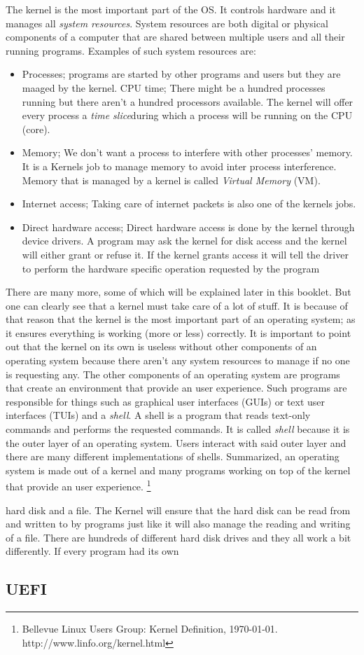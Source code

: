 The kernel is the most important part of the OS. It controls hardware and it
manages all \textit{system resources}. System resources are both digital or physical
components of a computer that are shared between multiple users and all their
running programs. Examples of such system resources are:
\begin{itemize}
\item Processes; programs are started by other programs and users but they are maaged by the kernel.
	CPU time; There might be a hundred processes running but there aren't a hundred processors available. The kernel will offer every process a \textit{time slice}during which a process will be running on the CPU (core).
\item Memory; We don't want a process to interfere with other processes' memory. It is a Kernels job to manage memory to avoid inter process interference. Memory that is managed by a kernel is called \textit{Virtual Memory} (VM).
\item Internet access; Taking care of internet packets is also one of the kernels jobs.
\item Direct hardware access; Direct hardware access is done by the kernel through device drivers. A program may ask the kernel for disk access and the kernel will either grant or refuse it. If the kernel grants access it will tell the driver to perform the hardware specific operation requested by the program
\end{itemize}
There are many more, some of which will be explained later in this booklet.
But one can clearly see that a kernel must take care of a lot of stuff. It
is because of that reason that the kernel is the most important part of an
operating system; as it ensures everything is working (more or less)
correctly. It is important to point out that the kernel on its own is useless
without other components of an operating system because there aren't any
system resources to manage if no one is requesting any.
The other components of an
operating system are programs that create an environment that provide an user
experience. Such programs are responsible for things such as graphical user
interfaces (GUIs) or text user interfaces (TUIs) and a \textit{shell}. A shell is a
program that reads text-only commands and performs the requested commands. It
is called \textit{shell} because it is the outer layer of an operating system. Users
interact with said outer layer and there are many different implementations
of shells. Summarized, an operating system is made out of a kernel and many programs working on top of the kernel that provide an user experience. \footnote{Bellevue Linux Users Group: Kernel Definition, \today . \\ http://www.linfo.org/kernel.html}


hard disk and a
file. The Kernel will ensure that the hard disk can be read from and written
to by programs just like it will also manage the reading and writing of a
file. There are hundreds of different hard disk drives and they all work a
bit differently. If every program had its own 

\subsection{UEFI}
